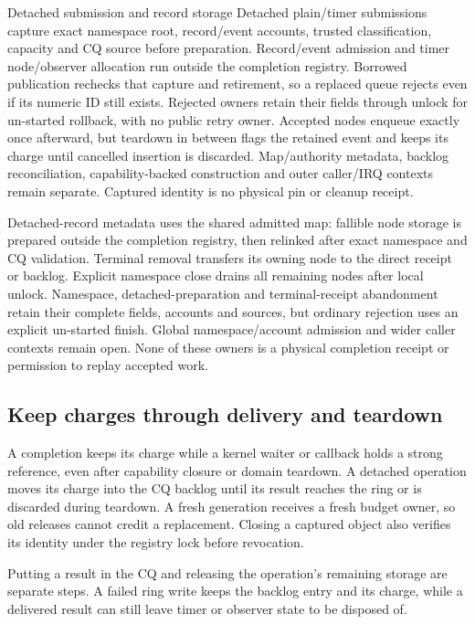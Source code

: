 \begin{implementationdetail}{Detached submission and record storage}
Detached plain/timer submissions capture exact namespace root, record/event
accounts, trusted classification, capacity and CQ source before preparation.
Record/event admission and timer node/observer allocation run outside the
completion registry. Borrowed publication rechecks that capture and retirement, so
a replaced queue rejects even if its numeric ID still exists. Rejected owners
retain their fields through unlock for un-started rollback, with no public retry
owner. Accepted nodes enqueue exactly once afterward, but teardown in between flags
the retained event and keeps its charge until cancelled insertion is discarded.
Map/authority metadata, backlog reconciliation, capability-backed construction
and outer caller/IRQ contexts remain separate. Captured identity is no physical
pin or cleanup receipt.

Detached-record metadata uses the shared admitted map: fallible node storage is
prepared outside the completion registry, then relinked after exact namespace
and CQ validation. Terminal removal transfers its owning node to the direct
receipt or backlog. Explicit namespace close drains all remaining nodes after
local unlock. Namespace, detached-preparation and terminal-receipt abandonment
retain their complete fields, accounts and sources, but ordinary rejection uses an
explicit un-started finish. Global namespace/account admission and wider caller
contexts remain open. None of these owners is a physical completion receipt or
permission to replay accepted work.
\end{implementationdetail}

\subsection{Keep charges through delivery and teardown}

A completion keeps its charge while a kernel waiter or callback holds a
strong reference, even after capability closure or domain teardown. A detached
operation moves its charge into the CQ backlog until its result reaches the
ring or is discarded during teardown. A fresh generation receives a fresh
budget owner, so old releases cannot credit a replacement. Closing a captured
object also verifies its identity under the registry lock before revocation.

Putting a result in the CQ and releasing the operation's remaining storage are
separate steps. A failed ring write keeps the backlog entry and its charge, while
a delivered result can still leave timer or observer state to be disposed of.

